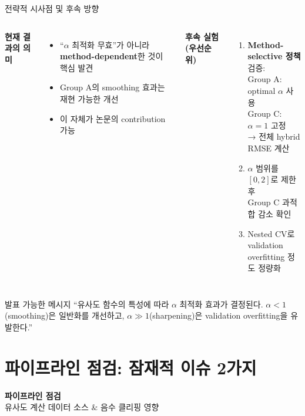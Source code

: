 \documentclass[aspectratio=169,10pt]{beamer}
\begin{document}
\begin{frame}{전략적 시사점 및 후속 방향}
	\begin{columns}[T]
			\textbf{현재 결과의 의미}
			\begin{itemize}
				\item ``\(\alpha\) 최적화 무효''가 아니라
					\textbf{method-dependent}한 것이 핵심 발견
				\item Group A의 smoothing 효과는 재현 가능한 개선
				\item 이 자체가 논문의 contribution 가능
			\end{itemize}

			\textbf{후속 실험 (우선순위)}
			\begin{enumerate}
				\item \textbf{Method-selective 정책} 검증:\\
					Group A: optimal \(\alpha\) 사용\\
					Group C: \(\alpha=1\) 고정\\
					→ 전체 hybrid RMSE 계산
				\item \(\alpha\) 범위를 \([0,2]\)로 제한 후\\
					Group C 과적합 감소 확인
				\item Nested CV로 validation\\
					overfitting 정도 정량화
			\end{enumerate}
	\end{columns}

	\vspace{0.4em}
	\begin{block}{발표 가능한 메시지}
		``유사도 함수의 특성에 따라 \(\alpha\) 최적화 효과가 결정된다.
		\(\alpha<1\)(smoothing)은 일반화를 개선하고,
		\(\alpha\gg1\)(sharpening)은 validation overfitting을 유발한다.''
	\end{block}
\end{frame}

\section{파이프라인 점검: 잠재적 이슈 2가지}

\begin{frame}[plain]
	\begin{center}
		\vspace{2.2cm}
		{\LARGE \textbf{파이프라인 점검}}\\[0.8em]
		{\large 유사도 계산 데이터 소스 \& 음수 클리핑 영향}
	\end{center}
\end{frame}
\end{document}
